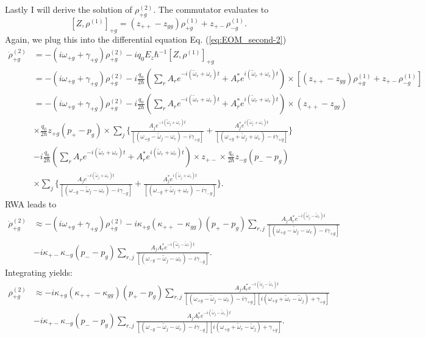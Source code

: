 \documentclass[preprint,secnumarabic,amssymb, nobibnotes, aip, prd]{revtex4-1}
\def\tw{\tilde{\omega}}
\def\tw{\tilde{\omega}}
\begin{document}
	Lastly I will derive the solution of $\rho_{+g}^{(2)}$. The commutator evaluates to
	 $$[Z,\rho^{(1)}]_{+g} =(z_{++}- z_{gg})\rho_{+g}^{(1)} + z_{+-}\rho_{-g}^{(1)}. $$ 
	 Again, we plug this into the differential equation Eq. (\ref{eq:EOM_second-2})
	\begin{align}
		\dot{\rho}_{+g}^{(2)} &= -(i\omega_{+g}+\gamma_{+g})\rho_{+g}^{(2)}  - i q_0E_z\hbar^{-1}[Z,\rho^{(1)}]_{+g} \nonumber \\
		&= -(i\omega_{+g}+\gamma_{+g})\rho_{+g}^{(2)} - i \frac{q_0}{2\hbar}(\sum_{r}A_r e^{-i(\tilde{\omega}_r+\omega_c)t} +  A_r^* e^{i(\tilde{\omega}_r+\omega_c)t}) \times [(z_{++}- z_{gg})\rho_{+g}^{(1)}  + z_{+-}\rho_{-g}^{(1)}] \nonumber \\
		&= -(i\omega_{+g}+\gamma_{+g})\rho_{+g}^{(2)} -i \frac{q_0}{2\hbar}(\sum_{r}A_r e^{-i(\tilde{\omega}_r+\omega_c)t} + A_r^* e^{i(\tilde{\omega}_r+\omega_c)t})  \times (z_{++}- z_{gg})  \nonumber \\ 
		&\times \frac{q_0}{2\hbar}z_{+g}(p_+-p_g)\times \sum_{j} \Big \{\frac{A_j e^{-i(\tw_j+\omega_c)t}}{[( \omega_{+g} - \tw_j-\omega_c) -i\gamma_{+ g}]} +\frac{A_j^* e^{i(\tw_j+\omega_c)t}}{[( \omega_{+ g} + \tw_j+\omega_c) -i\gamma_{+ g}]}	\Big \} \nonumber \\
		&- i \frac{q_0}{2\hbar}(\sum_{r}A_r e^{-i(\tilde{\omega}_r+\omega_c)t} +  A_r^* e^{i(\tilde{\omega}_r+\omega_c)t}) \times z_{+-} \times \frac{q_0}{2\hbar}z_{-g}(p_--p_g)\nonumber \\ 
		&\times \sum_{j} \Big \{\frac{A_j e^{-i(\tw_j+\omega_c)t}}{[( \omega_{-g} - \tw_j-\omega_c) -i\gamma_{- g}]} +\frac{A_j^* e^{i(\tw_j+\omega_c)t}}{[( \omega_{- g} + \tw_j+\omega_c) -i\gamma_{- g}]}
		\Big \} .
	\end{align}
	RWA leads to 
	\begin{align}
	\dot{\rho}_{+g}^{(2)} &\approx -(i\omega_{+g}+\gamma_{+g})\rho_{+g}^{(2)} -i\kappa_{+g}(\kappa_{++}-\kappa_{gg})(p_+-p_g)\sum_{r,j} \frac{ A_j A_r^* e^{-i(\tw_j-\tw_r)t}}{[( \omega_{+ g} - \tw_j-\omega_c) -i\gamma_{+ g}]} \nonumber \\ 
	&-i\kappa_{+-}\kappa_{-g}(p_--p_g)\sum_{r,j}\frac{ A_j A_r^* e^{-i(\tw_j-\tw_r)t}}{[( \omega_{-g} - \tw_j-\omega_c) -i\gamma_{-g}]}.
	\end{align}
	Integrating yields:
	\begin{align}
	\rho_{+g}^{(2)} &\approx -i\kappa_{+g}(\kappa_{++}-\kappa_{gg})(p_+-p_g)\sum_{r,j} \frac{ A_j A_r^* e^{-i(\tw_j-\tw_r)t}}{[( \omega_{+ g} - \tw_j-\omega_c) -i\gamma_{+ g}][i( \omega_{+ g} +\tw_r- \tw_j) +\gamma_{+ g}]} \nonumber \\ 
	&-i\kappa_{+-}\kappa_{-g}(p_--p_g)\sum_{r,j}\frac{ A_j A_r^* e^{-i(\tw_j-\tw_r)t}}{[( \omega_{-g} - \tw_j-\omega_c) -i\gamma_{-g}][i( \omega_{+ g} +\tw_r- \tw_j) +\gamma_{+ g}]}.
	\end{align}
\end{document}
